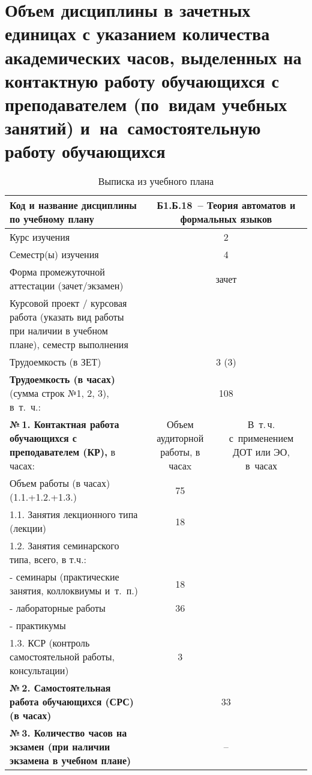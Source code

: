 \documentclass[a4paper,12pt]{article}
\begin{document}
\section{Объем дисциплины в зачетных единицах с указанием количества академических часов, выделенных на контактную работу обучающихся с преподавателем (по~видам учебных занятий) и~на~самостоятельную работу обучающихся}

\begin{table}[H]
\caption{Выписка из учебного плана} 
\begin{tabular}{|p{9cm}|c|c|}
\hline
Код и название дисциплины по учебному плану & \multicolumn{2}{p{6cm}|}{Б1.Б.18\ -- Теория автоматов и формальных языков }\\
\hline
Курс изучения &\multicolumn{2}{c|}{ 2 }\\
\hline
Семестр(ы) изучения &\multicolumn{2}{c|}{ 4 }\\
\hline
Форма промежуточной аттестации (зачет/экзамен) &\multicolumn{2}{c|}{ зачет }\\
\hline
Курсовой проект / курсовая работа (указать вид работы при наличии в учебном плане), семестр выполнения &\multicolumn{2}{c|}{ }\\
\hline
Трудоемкость (в ЗЕТ) &\multicolumn{2}{c|}{ 3 (3) }\\
\hline
{\bf Трудоемкость (в часах)} (сумма строк №1, 2, 3), в~т.~ч.:& \multicolumn{2}{c|}{108}\\
\hline
\textbf{№\,1. Контактная работа обучающихся с преподавателем (КР),} в часах:
& \multicolumn{1}{p{3cm}|}{\centering Объем аудиторной работы, в часаx}
& \multicolumn{1}{p{3cm}|}{\centering\arraybackslash В~т.\,ч. с~применением ДОТ или ЭО, в~часах}\\
\hline  
Объем работы (в часах) (1.1.+1.2.+1.3.)& 75 & \\
\hline
1.1. Занятия лекционного типа (лекции) & 18 & \\
\hline
1.2. Занятия семинарского типа, всего, в т.ч.: & & \\
\hline
- семинары (практические занятия, коллоквиумы и~т.~п.)  & 18 & \\
\hline
- лабораторные работы& 36 & \\
\hline
- практикумы & & \\
\hline
1.3. КСР (контроль самостоятельной работы, консультации)& 3 & \\
\hline
{\bf №\,2. Самостоятельная работа обучающихся (СРС) (в часах)}& \multicolumn{2}{c|}{33}\\
\hline
{\bf №\,3. Количество часов на экзамен (при наличии экзамена в учебном плане)}& \multicolumn{2}{c|}{–}\\
\hline
\end{tabular}
\end{table}
\end{document}
